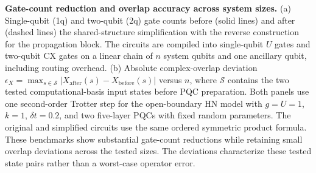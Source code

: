 \textbf{Gate-count reduction and overlap accuracy across system sizes.}
(a) Single-qubit (1q) and two-qubit (2q) gate counts before (solid lines)
and after (dashed lines) the shared-structure simplification with the reverse
construction for the propagation block. The circuits are compiled into
single-qubit $U$ gates and two-qubit CX gates on a linear chain of $n$ system
qubits and one ancillary qubit, including routing overhead.
(b) Absolute complex-overlap deviation
$\epsilon_X=\max_{s\in\mathcal S}|X_{\mathrm{after}}(s)-X_{\mathrm{before}}(s)|$
versus $n$, where $\mathcal S$ contains the two tested computational-basis
input states before PQC preparation.
Both panels use one second-order Trotter step for the open-boundary HN model
with $g=U=1$, $k=1$, $\delta t=0.2$, and two five-layer PQCs with fixed random
parameters. The original and simplified circuits use the same ordered
symmetric product formula. These benchmarks show substantial gate-count
reductions while retaining small overlap deviations across the tested sizes.
The deviations characterize these tested state pairs rather than a
worst-case operator error.
